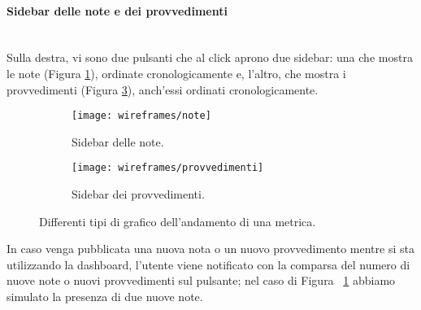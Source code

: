 \documentclass[../../../main.tex]{subfiles}
\begin{document}
\clearpage
\paragraph{Sidebar delle note e dei provvedimenti}\mbox{}\\
Sulla destra, vi sono due pulsanti che al click aprono due sidebar: una che mostra le note (Figura \ref{fig:note}), ordinate cronologicamente e, l'altro, che mostra i provvedimenti (Figura \ref{fig:provvedimenti}), anch'essi ordinati cronologicamente. 
\begin{figure}[H]
    \begin{subfigure}[b]{0.5\textwidth}
        \centering
        \texttt{[image: wireframes/note]}
        \caption{Sidebar delle note.}
        \label{fig:note}
    \end{subfigure}
\hfill
    \begin{subfigure}[b]{0.5\textwidth}
        \centering
        \texttt{[image: wireframes/provvedimenti]}
        \caption{Sidebar dei provvedimenti.}
        \label{fig:provvedimenti}
    \end{subfigure}
    \caption{Differenti tipi di grafico dell'andamento di una metrica.}
\end{figure}
In caso venga pubblicata una nuova nota o un nuovo provvedimento mentre si sta utilizzando la dashboard, l'utente viene notificato con la comparsa del numero di nuove note o nuovi provvedimenti sul pulsante; nel caso di Figura ~\ref{fig:note} abbiamo simulato la presenza di due nuove note.

\clearpage
\end{document}
